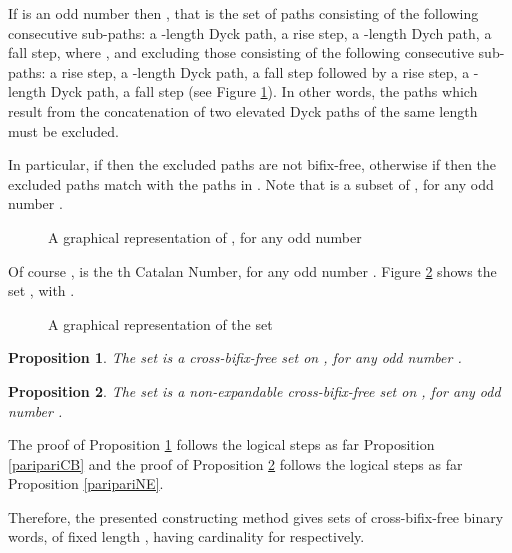 \documentclass[a4paper,11pt]{article}
\newtheorem{proposition}{Proposition}[section]
\begin{document}
If  is an odd number then , that is the set of paths consisting of the following
consecutive sub-paths: a -length Dyck path, a rise step, a
-length Dych path, a fall step, where , and excluding those consisting of the following
consecutive sub-paths: a rise step, a -length Dyck path, a
fall step followed by a rise step, a -length Dyck path, a
fall step (see Figure \ref{paridispari}). In other words, the
paths which result from the concatenation of two elevated Dyck
paths of the same length must be excluded.

In particular, if  then the excluded paths are not
bifix-free, otherwise if  then the excluded
paths match with the paths  in
. Note that  is a subset of
, for any odd number .

\begin{figure}[!htb]
\begin{center}
\caption{\small{A graphical representation of , for
any odd number } \label{paridispari}}\vspace{-15pt}
\end{center}
\end{figure}

Of course ,  is the th Catalan Number, for any
odd number . Figure \ref{exmparidis} shows the set
, with .

\begin{figure}[!htb]
\begin{center}
 \caption{\small{A
graphical representation of the set }
\label{exmparidis}}\vspace{-15pt}
\end{center}
\end{figure}

\begin{proposition}\label{paridispariCB}
The set  is a cross-bifix-free set on ,
for any odd number .
\end{proposition}

\begin{proposition}\label{padispariNE}
The set  is a non-expandable cross-bifix-free set on
, for any odd number .
\end{proposition}

The proof of Proposition \ref{paridispariCB} follows the logical
steps as far Proposition \ref{paripariCB} and the proof of
Proposition \ref{padispariNE} follows the logical steps as far
Proposition \ref{paripariNE}.

Therefore, the presented constructing method gives sets
 of cross-bifix-free binary words, of fixed length ,
having cardinality  for
 respectively.
\end{document}
